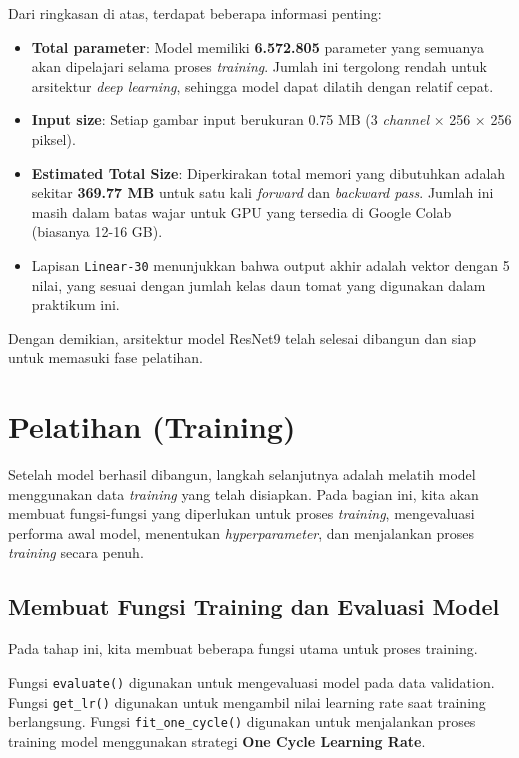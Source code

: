 Dari ringkasan di atas, terdapat beberapa informasi penting:

\begin{itemize}
    \item \textbf{Total parameter}: Model memiliki \textbf{6.572.805} parameter yang semuanya akan dipelajari selama proses \textit{training}. Jumlah ini tergolong rendah untuk arsitektur \textit{deep learning}, sehingga model dapat dilatih dengan relatif cepat.
    \item \textbf{Input size}: Setiap gambar input berukuran 0.75 MB (3 \textit{channel} × 256 × 256 piksel).
    \item \textbf{Estimated Total Size}: Diperkirakan total memori yang dibutuhkan adalah sekitar \textbf{369.77 MB} untuk satu kali \textit{forward} dan \textit{backward pass}. Jumlah ini masih dalam batas wajar untuk GPU yang tersedia di Google Colab (biasanya 12-16 GB).
    \item Lapisan \texttt{Linear-30} menunjukkan bahwa output akhir adalah vektor dengan 5 nilai, yang sesuai dengan jumlah kelas daun tomat yang digunakan dalam praktikum ini.
\end{itemize}

Dengan demikian, arsitektur model ResNet9 telah selesai dibangun dan siap untuk memasuki fase pelatihan.

\section{Pelatihan (Training)}

Setelah model berhasil dibangun, langkah selanjutnya adalah melatih model menggunakan data \textit{training} yang telah disiapkan. Pada bagian ini, kita akan membuat fungsi-fungsi yang diperlukan untuk proses \textit{training}, mengevaluasi performa awal model, menentukan \textit{hyperparameter}, dan menjalankan proses \textit{training} secara penuh.

\subsection{Membuat Fungsi Training dan Evaluasi Model}

Pada tahap ini, kita membuat beberapa fungsi utama untuk proses training.

Fungsi \texttt{evaluate()} digunakan untuk mengevaluasi model pada data validation. Fungsi \texttt{get\_lr()} digunakan untuk mengambil nilai learning rate saat training berlangsung. Fungsi \texttt{fit\_one\_cycle()} digunakan untuk menjalankan proses training model menggunakan strategi \textbf{One Cycle Learning Rate}.

